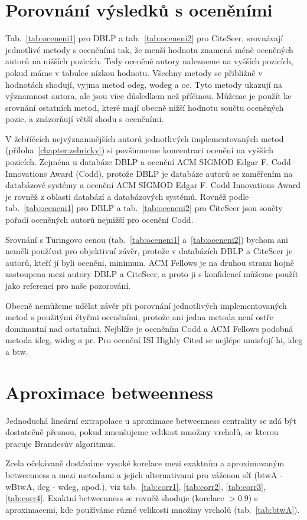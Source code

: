 \documentclass{bakalarka}
\begin{document}
\section{Porovnání výsledků s oceněními}
Tab.~\ref{tab:oceneni1} pro DBLP a tab.~\ref{tab:oceneni2} pro CiteSeer,
srovnávají jednotlivé metody s oceněními tak, že menší hodnota znamená méně
oceněných autorů na nižších pozicích. Tedy oceněné autory nalezneme na vyšších
pozicích, pokud máme v tabulce nízkou hodnotu. Všechny metody se přibližně v
hodnotách shodují, vyjma metod odeg, wodeg a oc. Tyto metody ukazují na
významnost autora, ale jsou více důsledkem než příčinou. Můžeme je použít ke
srovnání ostatních metod, které mají obecně nižší hodnotu součtu oceněných
pozic, a znázorňují větší shodu s oceněními.

V žebříčcích nejvýznamnějších autorů jednotlivých implementovaných metod
(příloha~\ref{chapter:zebricky}) si povšimneme koncentraci ocenění na vyšších
pozicích. Zejména u databáze DBLP a ocenění ACM SIGMOD Edgar F. Codd
Innovations Award (Codd), protože DBLP je databáze autorů se zaměřením na
databázové systémy a ocenění ACM SIGMOD Edgar F. Codd Innovations Award je
rovněž z oblasti databází a databázových systémů.  Rovněž podle
tab.~\ref{tab:oceneni1} pro DBLP a tab.~\ref{tab:oceneni2} pro CiteSeer jsou
součty pořadí oceněných autorů nejnižší pro ocenění Codd.

Srovnání s Turingovo cenou (tab.~\ref{tab:oceneni1} a~\ref{tab:oceneni2})
bychom ani neměli používat pro objektivní závěr, protože v databázích DBLP a
CiteSeer je autorů, kteří jí byli oceněni, minimum.  ACM Fellows je na druhou
stranu hojně zastoupena mezi autory DBLP a CiteSeer, a proto ji s konfidencí
můžeme použít jako referenci pro naše pozorování.

Obecně nemůžeme udělat závěr při porovnání jednotlivých implementovaných metod
s použitými čtyřmi oceněními, protože ani jedna metoda není ostře dominantní
nad ostatními. Nejblíže je oceněním Codd a ACM Fellows podobná metoda ideg,
wideg a pr. Pro ocenění ISI Highly Cited se nejlépe umisťují hi, ideg a btw.


\section{Aproximace betweenness}
Jednoduchá lineární extrapolace u aproximace betweenness centrality se zdá být
dostatečně přesnou, pokud zmenšujeme velikost množiny vrcholů, se kterou
pracuje Brandesův algoritmus.

Zcela očekávaně dostáváme vysoké korelace mezi exaktním a aproximovaným
betweenness a mezi metodami a jejich alternativami pro váženou síť (btwA -
wBtwA, deg - wdeg, apod.), viz tab.~\ref{tab:corr1}, \ref{tab:corr2},
\ref{tab:corr3}, \ref{tab:corr4}. Exaktní betweenness se rovněž shoduje
(korelace $> 0.9$) s aproximacemi, kde používáme různé velikosti množiny
vrcholů (tab.~\ref{tab:btwA}).
\end{document}
